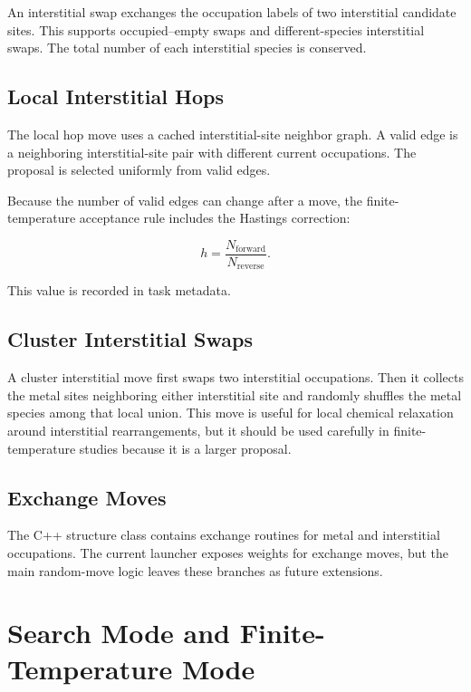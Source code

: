 \documentclass[11pt]{article}
\begin{document}
An interstitial swap exchanges the occupation labels of two interstitial candidate sites.
This supports occupied--empty swaps and different-species interstitial swaps.
The total number of each interstitial species is conserved.

\subsection{Local Interstitial Hops}

The local hop move uses a cached interstitial-site neighbor graph.
A valid edge is a neighboring interstitial-site pair with different current occupations.
The proposal is selected uniformly from valid edges.

Because the number of valid edges can change after a move, the finite-temperature acceptance rule includes the Hastings correction:

\begin{equation}
  h = \frac{N_{\mathrm{forward}}}{N_{\mathrm{reverse}}}.
\end{equation}

This value is recorded in task metadata.

\subsection{Cluster Interstitial Swaps}

A cluster interstitial move first swaps two interstitial occupations.
Then it collects the metal sites neighboring either interstitial site and randomly shuffles the metal species among that local union.
This move is useful for local chemical relaxation around interstitial rearrangements, but it should be used carefully in finite-temperature studies because it is a larger proposal.

\subsection{Exchange Moves}

The C++ structure class contains exchange routines for metal and interstitial occupations.
The current launcher exposes weights for exchange moves, but the main random-move logic leaves these branches as future extensions.

\section{Search Mode and Finite-Temperature Mode}
\end{document}
